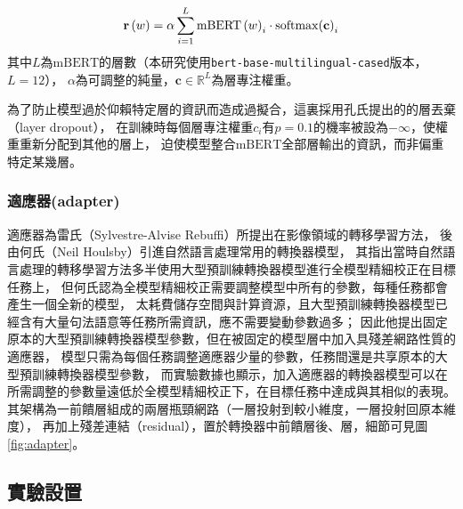 \begin{equation}
    \mathbf{r}\left(w\right) = \alpha \sum_{i=1}^{L} \mathrm{mBERT}\left(w\right)_{i} \cdot \mathrm{softmax} {\left(\mathbf{c}\right)}_{i}
\end{equation}
其中$L$為$\mathrm{mBERT}$的層數（本研究使用\texttt{bert-base-multilingual-cased}版本，$L=12$），
$\alpha$為可調整的純量，$\mathbf{c} \in \mathbb{R}^{L}$為層專注權重。

為了防止模型過於仰賴特定層的資訊而造成過擬合，這裏採用孔氏提出的\cite{kondratyuk-straka-2019-75}的層丟棄（layer dropout），
在訓練時每個層專注權重$c_{i}$有$p=0.1$的機率被設為$-\infty$，使權重重新分配到其他的層上，
迫使模型整合$\mathrm{mBERT}$全部層輸出的資訊，而非偏重特定某幾層。

\subsubsection{適應器(adapter)}

適應器為雷氏（Sylvestre-Alvise Rebuffi）\cite{rebuffi2018efficient}所提出在影像領域的轉移學習方法，
後由何氏（Neil Houlsby）引進自然語言處理常用的轉換器模型\cite{houlsby2019parameter}，
其指出當時自然語言處理的轉移學習方法多半使用大型預訓練轉換器模型進行全模型精細校正在目標任務上，
但何氏認為全模型精細校正需要調整模型中所有的參數，每種任務都會產生一個全新的模型，
太耗費儲存空間與計算資源，且大型預訓練轉換器模型已經含有大量句法語意等任務所需資訊，應不需要變動參數過多；
因此他提出固定原本的大型預訓練轉換器模型參數，但在被固定的模型層中加入具殘差網路性質的適應器，
模型只需為每個任務調整適應器少量的參數，任務間還是共享原本的大型預訓練轉換器模型參數，
而實驗數據也顯示，加入適應器的轉換器模型可以在所需調整的參數量遠低於全模型精細校正下，在目標任務中達成與其相似的表現。
其架構為一前饋層組成的兩層瓶頸網路（一層投射到較小維度，一層投射回原本維度），
再加上殘差連結（residual），置於轉換器中前饋層後、層，細節可見圖\ref{fig:adapter}。

%

\subsection{實驗設置}


